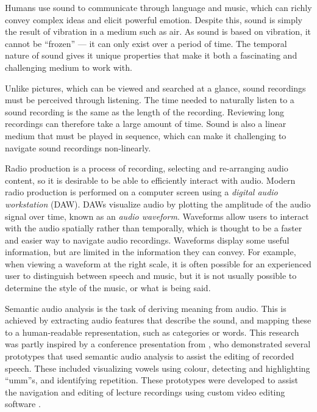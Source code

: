Humans use sound to communicate through language and music, which can richly convey complex ideas and elicit powerful
emotion. Despite this, sound is simply the result of vibration in a medium such as air.  As sound is based on
vibration, it cannot be ``frozen'' --- it can only exist over a period of time. The temporal nature of sound gives it
unique properties that make it both a fascinating and challenging medium to work with.

Unlike pictures, which can be viewed and searched at a glance, sound recordings must be perceived through listening.
The time needed to naturally listen to a sound recording is the same as the length of the recording.  Reviewing long
recordings can therefore take a large amount of time. Sound is also a linear medium that must be played in sequence,
which can make it challenging to navigate sound recordings non-linearly. 


Radio production is a process of recording, selecting and re-arranging audio content, so it is desirable to be able to
efficiently interact with audio.  Modern radio production is performed on a computer screen using a \textit{digital
audio workstation} (DAW). DAWs visualize audio by plotting the amplitude of the audio signal over time, known as an
\textit{audio waveform}.  Waveforms allow users to interact with the audio spatially rather than temporally, which is
thought to be a faster and easier way to navigate audio recordings.  Waveforms display some useful information, but are
limited in the information they can convey.  For example, when viewing a waveform at the right scale, it is often
possible for an experienced user to distinguish between speech and music, but it is not usually possible to determine
the style of the music, or what is being said.




Semantic audio analysis is the task of deriving meaning from audio. This is achieved by extracting audio features that
describe the sound, and mapping these to a human-readable representation, such as categories or words.
This research was partly inspired by a conference presentation from \citet{Loviscach2013}, who demonstrated several
prototypes that used semantic audio analysis to assist the editing of recorded speech. These included visualizing
vowels using colour, detecting and highlighting ``umm''s, and identifying repetition. These prototypes were developed
to assist the navigation and editing of lecture recordings using custom video editing software \citep{Loviscach2011a}.

